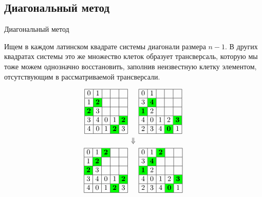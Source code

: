 \documentclass[8pt, hyperref={pdftex,unicode}, green]{beamer}
\newcommand{\cc}{\bf\cellcolor{green}}
\newcommand{\LSfive}[1]{
    \begin{array}{|>{\hspace{-2pt}}c<{\hspace{-2pt}}|>{\hspace{-2pt}}c<{\hspace{-2pt}}|>{\hspace{-2pt}}c<{\hspace{-2pt}}|>{\hspace{-2pt}}c<{\hspace{-2pt}}|>{\hspace{-2pt}}c<{\hspace{-2pt}}|}\hline
        #1
    \end{array}
}
\begin{document}
\subsection{Диагональный метод}
\begin{frame}{Диагональный метод}

    \begin{block}{}
        Ищем в каждом латинском квадрате системы диагонали размера $n - 1$.
        В других квадратах системы это же множество клеток образует трансверсаль, которую мы тоже можем однозначно восстановить, заполнив неизвестную клетку элементом, отсутствующим в рассматриваемой трансверсали.
    \end{block}

    \begin{gather*}
        \LSfive{
            0 & 1 &  &  &  \\ \hline
            1 & \cc 2 &  &  &  \\ \hline
            \cc 2 & 3 &  &  &  \\ \hline
            3 & 4 & 0 & 1 & \cc 2 \\ \hline
            4 & 0 & 1 & \cc 2 & 3 \\ \hline
        }
        \hspace{1.5em}
        \LSfive{
            0 & 1 &  &  &  \\ \hline
            3 & \cc 4 &  &  &  \\ \hline
            \cc 1 & 2 &  &  &  \\ \hline
            4 & 0 & 1 & 2 & \cc 3 \\ \hline
            2 & 3 & 4 & \cc 0 & 1 \\ \hline
        }\\
        \Downarrow
        \\
        \LSfive{
            0 & 1 & \cc 2 &  &  \\ \hline
            1 & \cc 2 &  &  &  \\ \hline
            \cc 2 & 3 &  &  &  \\ \hline
            3 & 4 & 0 & 1 & \cc 2 \\ \hline
            4 & 0 & 1 & \cc 2 & 3 \\ \hline
        }
        \hspace{1.5em}
        \LSfive{
            0 & 1 & \cc 2 &  &  \\ \hline
            3 & \cc 4 &  &  &  \\ \hline
            \cc 1 & 2 &  &  &  \\ \hline
            4 & 0 & 1 & 2 & \cc 3 \\ \hline
            2 & 3 & 4 & \cc 0 & 1 \\ \hline
        }
    \end{gather*}
\end{frame}
\end{document}
